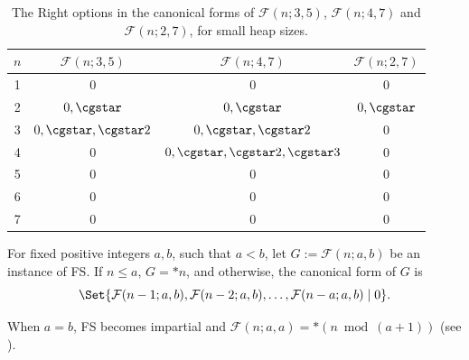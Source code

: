 \documentclass[oneside,reqno]{amsart}
\newcommand{\fs}{\mathcal{F}}
\begin{document}
\begin{table}[ht!]
\centering
\renewcommand{\arraystretch}{1.2}
\caption{The Right options in the canonical forms of $\fs(n;3,5)$, $\fs(n;4,7)$ and $\fs(n;2,7)$, for small heap sizes.}
\label{tab: right options of FS}
\small
\begin{tabular}{|c|c|c|c|}
\hline

$n$ & $\fs(n;3,5)$ & $\fs(n;4,7)$ &  $\fs(n;2,7)$ \\ 
\hline
1  & $0$            & $0$               & $0$ \\ \hline
2  & $0,\cgstar$           & $0,\cgstar$              & $0,\cgstar$ \\ \hline
3  & $0,\cgstar,\cgstar2$         & $0,\cgstar,\cgstar2$            &  $0$\\ \hline
4  & $0$            & $0,\cgstar,\cgstar2,\cgstar3$        &  $0$\\ \hline
5  & $0$            & $0$               &  $0$\\ \hline
6  & $0$            & $0$               &  $0$\\ \hline
7  & $0$            & $0$               &  $0$\\ \hline
\end{tabular}
\end{table}



\begin{theorem}\label{thm: CF of FS}
    For fixed positive integers $a,b$, such that $a<b$, let $G:=\fs(n;a,b)$ be an instance of {\sc FS}. If $n\le a$, $G=*n$, and otherwise, the canonical form of $G$ is \begin{equation}
        \Set{\fs(n-1;a,b), \fs(n-2;a,b),\dots,\fs(n-a;a,b)\mid 0}.
    \label{eq:cf of FS}\end{equation} 
\end{theorem}

When $a=b$, {\sc FS} becomes impartial and 
    $\fs(n;a,a)=*(n \bmod (a+1))$ (see \cite{BCG2004}).

\end{document}
